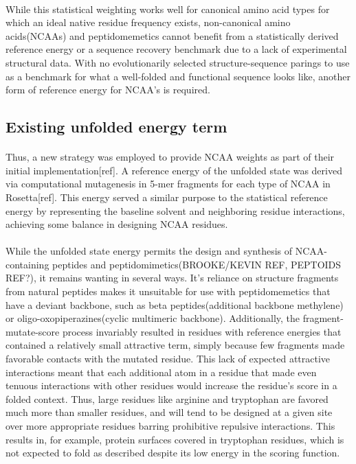 \paragraph{}
While this statistical weighting works well for canonical amino acid types for which an ideal native residue frequency exists, non-canonical amino acids(NCAAs) and peptidomemetics cannot benefit from a statistically derived reference energy or a sequence recovery benchmark due to a lack of experimental structural data. With no evolutionarily selected structure-sequence parings to use as a benchmark for what a well-folded and functional sequence looks like, another form of reference energy for NCAA's is required.

\subsection{Existing unfolded energy term}

\paragraph{}
Thus, a new strategy was employed to provide NCAA weights as part of their initial implementation[ref].
A reference energy of the unfolded state was derived via computational mutagenesis in 5-mer fragments for each type of NCAA in Rosetta[ref].
This energy served a similar purpose to the statistical reference energy by representing the baseline solvent and neighboring residue interactions, achieving some balance in designing NCAA residues.

\paragraph{}
While the unfolded state energy permits the design and synthesis of NCAA-containing peptides and peptidomimetics(BROOKE/KEVIN REF, PEPTOIDS REF?), it remains wanting in several ways.
It's reliance on structure fragments from natural peptides makes it unsuitable for use with peptidomemetics that have a deviant backbone, such as beta peptides(additional backbone methylene) or oligo-oxopiperazines(cyclic multimeric backbone).
Additionally, the fragment-mutate-score process invariably resulted in residues with reference energies that contained a relatively small attractive term, simply because few fragments made favorable contacts with the mutated residue.
This lack of expected attractive interactions meant that each additional atom in a residue that made even tenuous interactions with other residues would increase the residue's score in a folded context.
Thus, large residues like arginine and tryptophan are favored much more than smaller residues, and will tend to be designed at a given site over more appropriate residues barring prohibitive repulsive interactions.
This results in, for example, protein surfaces covered in tryptophan residues, which is not expected to fold as described despite its low energy in the scoring function.

